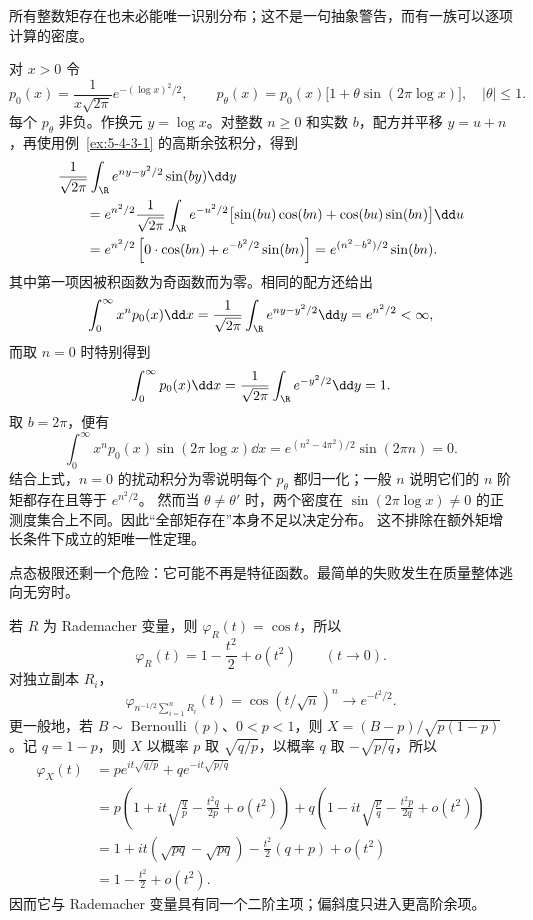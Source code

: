 所有整数矩存在也未必能唯一识别分布；这不是一句抽象警告，而有一族可以逐项计算的密度。

\begin{remark}[所有整数矩仍可能不唯一决定分布]\label{rem:5-4-3-moment-indeterminate}
对 $x>0$ 令
\[
 p_0(x)=\frac1{x\sqrt{2\pi}}e^{-(\log x)^2/2},
 \qquad
 p_\theta(x)=p_0(x)\bigl[1+\theta\sin(2\pi\log x)\bigr],
 \quad |\theta|\leq1.
\]
每个 $p_\theta$ 非负。作换元 $y=\log x$。对整数 $n\geq0$ 和实数 $b$，配方并平移
$y=u+n$，再使用例~\ref{ex:5-4-3-1} 的高斯余弦积分，得到
\begin{align*}
 &\frac1{\sqrt{2\pi}}\int_{\R}
 e^{ny-y^2/2}\sin(by)\dd y\\
 &\qquad=e^{n^2/2}\frac1{\sqrt{2\pi}}
 \int_{\R}e^{-u^2/2}\bigl[\sin(bu)\cos(bn)+\cos(bu)\sin(bn)\bigr]\dd u\\
 &\qquad=e^{n^2/2}\left[0\cdot\cos(bn)+e^{-b^2/2}\sin(bn)\right]
 =e^{(n^2-b^2)/2}\sin(bn).
\end{align*}
其中第一项因被积函数为奇函数而为零。相同的配方还给出
\[
 \int_0^\infty x^np_0(x)\dd x
 =\frac1{\sqrt{2\pi}}\int_{\R}e^{ny-y^2/2}\dd y
 =e^{n^2/2}<\infty,
\]
而取 $n=0$ 时特别得到
\[
 \int_0^\infty p_0(x)\dd x
 =\frac1{\sqrt{2\pi}}\int_{\R}e^{-y^2/2}\dd y=1.
\]
取 $b=2\pi$，便有
\[
 \int_0^\infty x^np_0(x)\sin(2\pi\log x)\dd x
 =e^{(n^2-4\pi^2)/2}\sin(2\pi n)=0.
\]
结合上式，$n=0$ 的扰动积分为零说明每个 $p_\theta$ 都归一化；一般 $n$ 说明它们的
$n$ 阶矩都存在且等于 $e^{n^2/2}$。
然而当 $\theta\ne\theta'$ 时，两个密度在
$\sin(2\pi\log x)\ne0$ 的正测度集合上不同。因此“全部矩存在”本身不足以决定分布。
这不排除在额外矩增长条件下成立的矩唯一性定理。
\end{remark}


点态极限还剩一个危险：它可能不再是特征函数。最简单的失败发生在质量整体逃向无穷时。

\begin{example}\label{ex:5-4-3-2}
若 $R$ 为 Rademacher 变量，则 $\varphi_R(t)=\cos t$，所以
\[
 \varphi_R(t)=1-\frac{t^2}{2}+o(t^2)\qquad(t\to0).
\]
对独立副本 $R_i$，
\[
 \varphi_{n^{-1/2}\sum_{i=1}^nR_i}(t)
 =\cos(t/\sqrt n)^n\longrightarrow e^{-t^2/2}.
\]
更一般地，若 $B\sim\operatorname{Bernoulli}(p)$、$0<p<1$，则
$X=(B-p)/\sqrt{p(1-p)}$。记 $q=1-p$，则 $X$ 以概率 $p$ 取
$\sqrt{q/p}$，以概率 $q$ 取 $-\sqrt{p/q}$，所以
\begin{align*}
 \varphi_X(t)
 &=p e^{it\sqrt{q/p}}+q e^{-it\sqrt{p/q}}\\
 &=p\left(1+it\sqrt{\frac qp}-\frac{t^2q}{2p}+o(t^2)\right)
  +q\left(1-it\sqrt{\frac pq}-\frac{t^2p}{2q}+o(t^2)\right)\\
 &=1+it(\sqrt{pq}-\sqrt{pq})-\frac{t^2}{2}(q+p)+o(t^2)\\
 &=1-\frac{t^2}{2}+o(t^2).
\end{align*}
因而它与 Rademacher 变量具有同一个二阶主项；偏斜度只进入更高阶余项。
\end{example}


